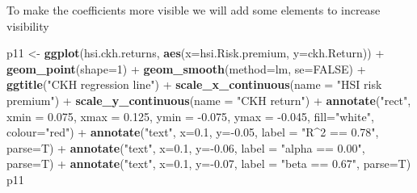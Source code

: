 \documentclass[]{article}
\newenvironment{Shaded}{\begin{snugshade}}{\end{snugshade}}
\newcommand{\KeywordTok}[1]{\textcolor[rgb]{0.13,0.29,0.53}{\textbf{{#1}}}}
\newcommand{\DataTypeTok}[1]{\textcolor[rgb]{0.13,0.29,0.53}{{#1}}}
\newcommand{\DecValTok}[1]{\textcolor[rgb]{0.00,0.00,0.81}{{#1}}}
\newcommand{\FloatTok}[1]{\textcolor[rgb]{0.00,0.00,0.81}{{#1}}}
\newcommand{\StringTok}[1]{\textcolor[rgb]{0.31,0.60,0.02}{{#1}}}
\newcommand{\OtherTok}[1]{\textcolor[rgb]{0.56,0.35,0.01}{{#1}}}
\newcommand{\NormalTok}[1]{{#1}}
\begin{document}
To make the coefficients more visible we will add some elements to
increase visibility

\begin{Shaded}
\begin{Highlighting}[]
\NormalTok{p11 <-}\StringTok{ }\KeywordTok{ggplot}\NormalTok{(hsi.ckh.returns, }\KeywordTok{aes}\NormalTok{(}\DataTypeTok{x=}\NormalTok{hsi.Risk.premium, }\DataTypeTok{y=}\NormalTok{ckh.Return)) +}\StringTok{ }
\StringTok{      }\KeywordTok{geom_point}\NormalTok{(}\DataTypeTok{shape=}\DecValTok{1}\NormalTok{) +}\StringTok{ }\KeywordTok{geom_smooth}\NormalTok{(}\DataTypeTok{method=}\NormalTok{lm, }\DataTypeTok{se=}\OtherTok{FALSE}\NormalTok{) +}
\StringTok{      }\KeywordTok{ggtitle}\NormalTok{(}\StringTok{"CKH regression line"}\NormalTok{) +}
\StringTok{      }\KeywordTok{scale_x_continuous}\NormalTok{(}\DataTypeTok{name =} \StringTok{"HSI risk premium"}\NormalTok{) +}
\StringTok{      }\KeywordTok{scale_y_continuous}\NormalTok{(}\DataTypeTok{name =} \StringTok{"CKH return"}\NormalTok{) +}
\StringTok{      }\KeywordTok{annotate}\NormalTok{(}\StringTok{"rect"}\NormalTok{, }\DataTypeTok{xmin =} \FloatTok{0.075}\NormalTok{, }\DataTypeTok{xmax =} \FloatTok{0.125}\NormalTok{, }\DataTypeTok{ymin =} \NormalTok{-}\FloatTok{0.075}\NormalTok{, }\DataTypeTok{ymax =} \NormalTok{-}\FloatTok{0.045}\NormalTok{, }\DataTypeTok{fill=}\StringTok{"white"}\NormalTok{, }\DataTypeTok{colour=}\StringTok{"red"}\NormalTok{) +}\StringTok{ }
\StringTok{      }\KeywordTok{annotate}\NormalTok{(}\StringTok{"text"}\NormalTok{, }\DataTypeTok{x=}\FloatTok{0.1}\NormalTok{, }\DataTypeTok{y=}\NormalTok{-}\FloatTok{0.05}\NormalTok{, }\DataTypeTok{label =} \StringTok{"R^2 == 0.78"}\NormalTok{, }\DataTypeTok{parse=}\NormalTok{T) +}\StringTok{ }\KeywordTok{annotate}\NormalTok{(}\StringTok{"text"}\NormalTok{, }\DataTypeTok{x=}\FloatTok{0.1}\NormalTok{, }\DataTypeTok{y=}\NormalTok{-}\FloatTok{0.06}\NormalTok{, }\DataTypeTok{label =} \StringTok{"alpha == 0.00"}\NormalTok{, }\DataTypeTok{parse=}\NormalTok{T) +}\StringTok{ }
\StringTok{      }\KeywordTok{annotate}\NormalTok{(}\StringTok{"text"}\NormalTok{, }\DataTypeTok{x=}\FloatTok{0.1}\NormalTok{, }\DataTypeTok{y=}\NormalTok{-}\FloatTok{0.07}\NormalTok{, }\DataTypeTok{label =} \StringTok{"beta == 0.67"}\NormalTok{, }\DataTypeTok{parse=}\NormalTok{T)}
\NormalTok{p11}
\end{Highlighting}
\end{Shaded}
\end{document}

